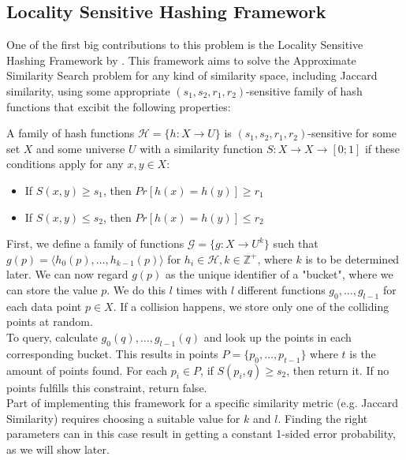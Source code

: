 \subsection{Locality Sensitive Hashing Framework}
One of the first big contributions to this problem is the Locality Sensitive Hashing Framework by \citet{Indyk1998ApproximateNN}. This framework aims to solve the Approximate Similarity Search problem for any kind of similarity space, including Jaccard similarity, using some appropriate $(s_1, s_2, r_1, r_2)$-sensitive family of hash functions that excibit the following properties:
\begin{definition}
\label{thm:sensitive-hash}
A family of hash functions $\mathcal{H}=\{h:X\rightarrow U\}$ is $(s_1, s_2, r_1, r_2)$-sensitive for some set $X$ and some universe $U$ with a similarity function $S:X\rightarrow X \rightarrow [0;1]$ if these conditions apply for any $x,y \in X$:
\begin{itemize}
    \item If $S(x,y) \geq s_1$, then $Pr[h(x)=h(y)] \geq r_1$
    \item If $S(x,y) \leq s_2$, then $Pr[h(x)=h(y)] \leq r_2$
\end{itemize}
\end{definition}
First, we define a family of functions $\mathcal{G}=\{g : X \rightarrow U^k \}$ such that $g(p)=\langle h_0(p), \dots, h_{k-1}(p)\rangle$ for $h_i\in \mathcal{H}, k\in \mathbb{Z}^+$, where $k$ is to be determined later. We can now regard $g(p)$ as the unique identifier of a "bucket", where we can store the value $p$. We do this $l$ times with $l$ different functions $g_0, \dots, g_{l-1}$ for each data point $p\in X$. If a collision happens, we store only one of the colliding points at random.\\
To query, calculate $g_0(q), \dots, g_{l-1}(q)$ and look up the points in each corresponding bucket. This results in points $P=\{p_0, \dots, p_{t-1}\}$ where $t$ is the amount of points found. For each $p_i \in P$, if $S(p_i, q) \geq s_2$, then return it. If no points fulfills this constraint, return false.\\
Part of implementing this framework for a specific similarity metric (e.g. Jaccard Similarity) requires choosing a suitable value for $k$ and $l$. Finding the right parameters can in this case result in getting a constant 1-sided error probability, as we will show later.
